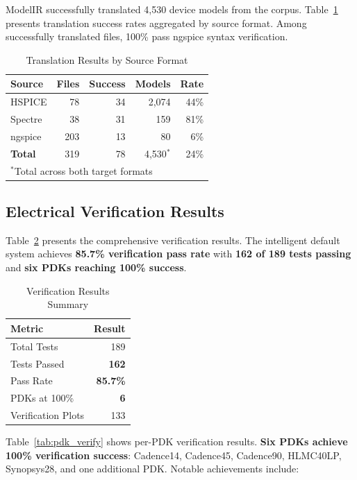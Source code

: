 \documentclass[conference]{IEEEtran}
\begin{document}
ModelIR successfully translated 4,530 device models from the corpus. Table~\ref{tab:results} presents translation success rates aggregated by source format. Among successfully translated files, 100\% pass ngspice syntax verification.

\begin{table}[!t]
\caption{Translation Results by Source Format}
\label{tab:results}
\centering
\renewcommand{\arraystretch}{1.15}
\begin{tabular}{@{}lrrrr@{}}
\toprule
\textbf{Source} & \textbf{Files} & \textbf{Success} & \textbf{Models} & \textbf{Rate} \\
\midrule
HSPICE & 78 & 34 & 2,074 & 44\% \\
Spectre & 38 & 31 & 159 & 81\% \\
ngspice & 203 & 13 & 80 & 6\% \\
\midrule
\textbf{Total} & 319 & 78 & 4,530$^*$ & 24\% \\
\bottomrule
\multicolumn{5}{l}{\footnotesize $^*$Total across both target formats}
\end{tabular}
\end{table}

\subsection{Electrical Verification Results}

Table~\ref{tab:verify_results} presents the comprehensive verification results. The intelligent default system achieves \textbf{85.7\% verification pass rate} with \textbf{162 of 189 tests passing} and \textbf{six PDKs reaching 100\% success}.

\begin{table}[!t]
\caption{Verification Results Summary}
\label{tab:verify_results}
\centering
\renewcommand{\arraystretch}{1.15}
\begin{tabular}{@{}lr@{}}
\toprule
\textbf{Metric} & \textbf{Result} \\
\midrule
Total Tests & 189 \\
Tests Passed & \textbf{162} \\
Pass Rate & \textbf{85.7\%} \\
PDKs at 100\% & \textbf{6} \\
Verification Plots & 133 \\
\bottomrule
\end{tabular}
\end{table}

Table~\ref{tab:pdk_verify} shows per-PDK verification results. \textbf{Six PDKs achieve 100\% verification success}: Cadence14, Cadence45, Cadence90, HLMC40LP, Synopsys28, and one additional PDK. Notable achievements include:
\end{document}
